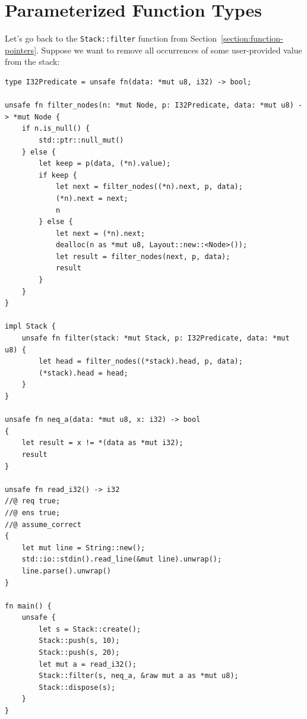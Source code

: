 \documentclass{article}
\begin{document}
\section{Parameterized Function Types}\label{section:parameterized-function-types}

Let's go back to the \lstinline!Stack::filter! function from
Section~\ref{section:function-pointers}. Suppose we want to
remove all occurrences of some user-provided value from the
stack:
\begin{lstlisting}
type I32Predicate = unsafe fn(data: *mut u8, i32) -> bool;

unsafe fn filter_nodes(n: *mut Node, p: I32Predicate, data: *mut u8) -> *mut Node {
    if n.is_null() {
        std::ptr::null_mut()
    } else {
        let keep = p(data, (*n).value);
        if keep {
            let next = filter_nodes((*n).next, p, data);
            (*n).next = next;
            n
        } else {
            let next = (*n).next;
            dealloc(n as *mut u8, Layout::new::<Node>());
            let result = filter_nodes(next, p, data);
            result
        }
    }
}

impl Stack {
    unsafe fn filter(stack: *mut Stack, p: I32Predicate, data: *mut u8) {
        let head = filter_nodes((*stack).head, p, data);
        (*stack).head = head;
    }
}

unsafe fn neq_a(data: *mut u8, x: i32) -> bool
{
    let result = x != *(data as *mut i32);
    result
}

unsafe fn read_i32() -> i32
//@ req true;
//@ ens true;
//@ assume_correct
{
    let mut line = String::new();
    std::io::stdin().read_line(&mut line).unwrap();
    line.parse().unwrap()
}

fn main() {
    unsafe {
        let s = Stack::create();
        Stack::push(s, 10);
        Stack::push(s, 20);
        let mut a = read_i32();
        Stack::filter(s, neq_a, &raw mut a as *mut u8);
        Stack::dispose(s);
    }
}
\end{lstlisting}
\end{document}
